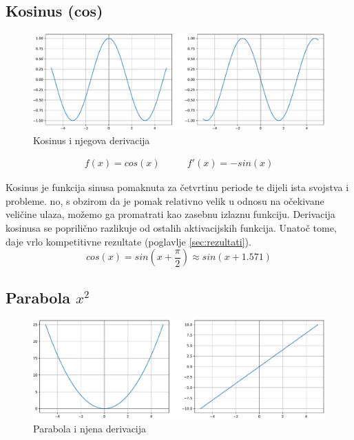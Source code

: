 \documentclass[times, utf8, diplomski]{fer}
\begin{document}
\subsection{Kosinus (cos)}

\begin{figure}[H]
\includegraphics[width=\textwidth]{Cos.pdf}
\centering
\caption{Kosinus i njegova derivacija}
\label{fig:cos}
\end{figure}

\begin{equation}
\begin{split}
f(x) = cos(x)
\end{split}
\qquad
\begin{split}
f'(x) = -sin(x)
\end{split}
\end{equation}

Kosinus je funkcija sinusa pomaknuta za četvrtinu periode te dijeli ista svojstva i probleme. no, s obzirom da je pomak relativno velik u odnosu na očekivane veličine ulaza, možemo ga promatrati kao zasebnu izlaznu funkciju. Derivacija kosinusa se poprilično razlikuje od ostalih aktivacijskih funkcija. Unatoč tome, daje vrlo kompetitivne rezultate (poglavlje \ref{sec:rezultati}).
\begin{equation}
cos(x) = sin(x + \frac{\pi}{2}) \approx sin(x + 1.571)
\end{equation}

\subsection{Parabola $x^2$}

\begin{figure}[H]
\includegraphics[width=\textwidth]{Pow2.pdf}
\centering
\caption{Parabola i njena derivacija}
\label{fig:pow2}
\end{figure}
\end{document}
